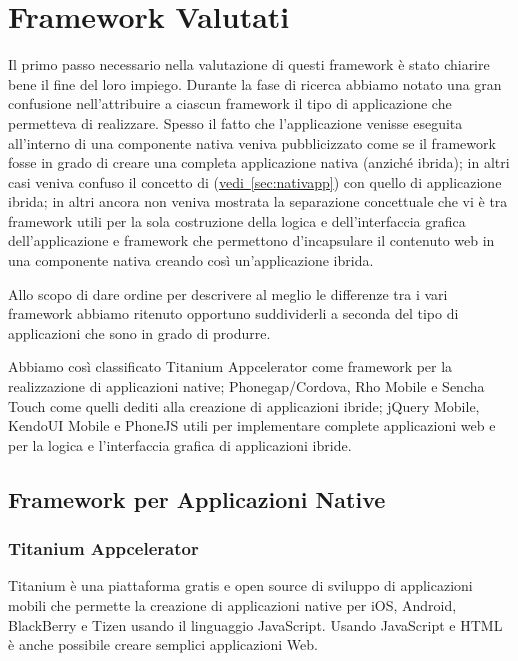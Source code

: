\chapter{Framework Valutati}
	Il primo passo necessario nella valutazione di questi framework è stato 
	chiarire bene il fine del loro impiego. Durante la fase di ricerca abbiamo 
	notato una gran confusione nell'attribuire a ciascun framework il tipo di
	applicazione che permetteva di realizzare. Spesso il fatto che 
	l'applicazione venisse eseguita all'interno di una componente nativa veniva 
	pubblicizzato come se il framework fosse in grado di creare una completa 
	applicazione nativa (anziché ibrida); in altri casi 
	veniva confuso il concetto di \crosscomp 
	(\hyperref[sec:nativapp]{vedi~\ref{sec:nativapp}}) con quello di 
	applicazione ibrida; in altri ancora non veniva mostrata la separazione 
	concettuale che vi è tra framework utili per la sola costruzione della 
	logica e dell'interfaccia grafica dell'applicazione e framework che 
	permettono d'incapsulare il contenuto web in una componente nativa creando 
	così un'applicazione ibrida.
	
	Allo scopo di dare ordine per descrivere al meglio le differenze tra i vari 
	framework abbiamo ritenuto opportuno suddividerli a seconda del tipo di 
	applicazioni che sono in grado di produrre.
	
	Abbiamo così classificato Titanium Appcelerator come framework per la 
	realizzazione di applicazioni native; Phonegap/Cordova, Rho Mobile e Sencha 
	Touch come quelli dediti alla creazione di applicazioni ibride; jQuery 
	Mobile, KendoUI Mobile e PhoneJS utili per implementare complete 
	applicazioni web e per la logica e l'interfaccia grafica di applicazioni 
	ibride.

	\section{Framework per Applicazioni Native}
		
		\subsection{Titanium Appcelerator}
		\label{sec:titanium}
			Titanium è una piattaforma gratis e open source di sviluppo di 
			applicazioni mobili che permette la creazione di applicazioni native
			\crossplat{} per iOS, Android, BlackBerry e Tizen usando il 
			linguaggio JavaScript. Usando JavaScript e HTML è anche possibile
			creare semplici applicazioni Web.
			
